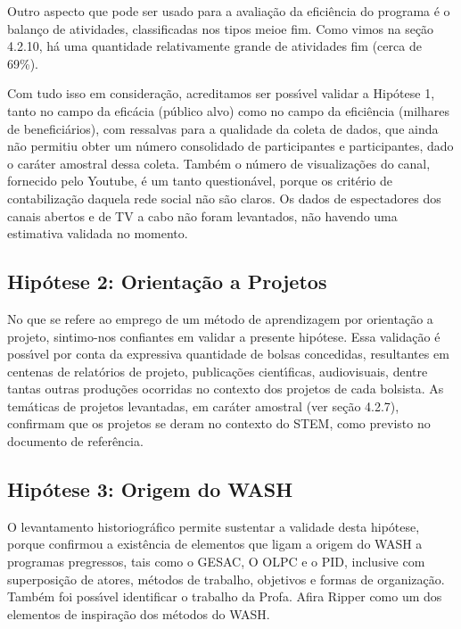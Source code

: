 \documentclass[
12pt,		%
openright,	%
twoside,  %
a4paper,			%
chapter=TITLE,		%
english,			%
french,				%
spanish,			%
brazil				%
]{USPSC-classe/USPSC}
\begin{document}
Outro aspecto que pode ser usado para a avalia\c{c}\~ao da efici\^encia do programa \'e o balan\c{c}o de atividades, classificadas nos tipos \textquotedbl meio\textquotedbl  e \textquotedbl fim\textquotedbl . Como vimos na se\c{c}\~ao 4.2.10, h\'a uma quantidade relativamente grande de atividades fim (cerca de 69\%).








Com tudo isso em considera\c{c}\~ao, acreditamos ser poss\'{\i}vel validar a Hip\'otese 1, tanto no campo da efic\'acia (p\'ublico alvo) como no campo da efici\^encia (milhares de benefici\'arios), com ressalvas para a qualidade da coleta de dados, que ainda n\~ao permitiu obter um n\'umero consolidado de participantes e participantes, dado o car\'ater amostral dessa coleta. Tamb\'em o n\'umero de visualiza\c{c}\~oes do canal, fornecido pelo Youtube, \'e um tanto question\'avel, porque os crit\'erio de contabiliza\c{c}\~ao daquela rede social n\~ao s\~ao claros. Os dados de espectadores dos canais abertos e de TV a cabo n\~ao foram levantados, n\~ao havendo uma estimativa validada no momento.








\subsection[Hip\'otese 2: Orienta\c{c}\~ao a Projetos]{Hip\'otese 2: Orienta\c{c}\~ao a Projetos}\label{Hip\'otese 2: Orienta\c{c}\~ao a Projetos}
No que se refere ao emprego de um m\'etodo de aprendizagem por \textquotedbl orienta\c{c}\~ao a projeto\textquotedbl , sintimo-nos confiantes em validar a presente hip\'otese. Essa valida\c{c}\~ao \'e poss\'{\i}vel por conta da expressiva quantidade de bolsas concedidas, resultantes em centenas de relat\'orios de projeto, publica\c{c}\~oes cient\'{\i}ficas, audiovisuais, dentre tantas outras produ\c{c}\~oes ocorridas no contexto dos projetos de cada bolsista. As tem\'aticas de projetos levantadas, em car\'ater amostral (ver se\c{c}\~ao 4.2.7), confirmam que os projetos se deram no contexto do STEM, como previsto no documento de refer\^encia.








\subsection[Hip\'otese 3: Origem do WASH]{Hip\'otese 3: Origem do WASH}\label{Hip\'otese 3: Origem do WASH}
O levantamento historiogr\'afico permite sustentar a validade desta hip\'otese, porque confirmou a exist\^encia de elementos que ligam a origem do WASH a programas pregressos, tais como o GESAC, O OLPC e o PID, inclusive com superposi\c{c}\~ao de atores, m\'etodos de trabalho, objetivos e formas de organiza\c{c}\~ao. Tamb\'em foi poss\'{\i}vel identificar o trabalho da Profa. Afira Ripper como um dos elementos de inspira\c{c}\~ao dos m\'etodos do WASH.
\end{document}
